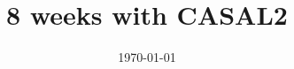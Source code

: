 \documentclass{beamer}
\title[Short title]{8 weeks with CASAL2} %
\date{\today} %
\begin{document}
\begin{frame}
\titlepage %
\end{frame}




\end{document}
